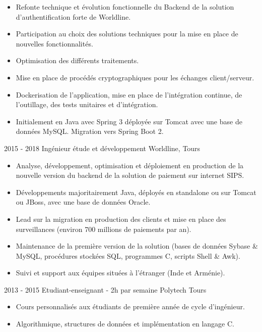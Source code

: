 \documentclass[]{friggeri-cv}
\begin{document}
\begin{entrylist}
{	\begin{itemize}[leftmargin=*]
		\item Refonte technique et évolution fonctionnelle du Backend de la solution d'authentification forte de Worldline.
		\item Participation au choix des solutions techniques pour la mise en place de nouvelles fonctionnalités.
		\item Optimisation des différents traitements.
		\item Mise en place de procédés cryptographiques pour les échanges client/serveur.
		\item Dockerisation de l'application, mise en place de l'intégration continue, de l'outillage, des tests unitaires et d'intégration.
		\item Initialement en Java avec Spring 3 déployée sur Tomcat avec une base de données MySQL. Migration vers Spring Boot 2.
	\end{itemize}
	}
      \entry
    {2015 - 2018}
    {Ingénieur étude et développement}
    {Worldline, Tours}
    {
    \vspace{-0.8\baselineskip}
    \begin{itemize}[leftmargin=*]
		\item Analyse, développement, optimisation et déploiement en production de la nouvelle version du backend de la solution de paiement sur internet SIPS.
		\item Développements majoritairement Java, déployés en standalone ou sur Tomcat ou JBoss,  avec une base de données Oracle.
		\item Lead sur la migration en production des clients et mise en place des surveillances (environ 700 millions de paiements par an).
		\item Maintenance de la première version de la solution (bases de données Sybase \& MySQL, procédures stockées SQL, programmes C, scripts Shell \& Awk).
		\item Suivi et support aux équipes situées à l'étranger (Inde et Arménie).
	\end{itemize}
}
    \entry
    {2013 - 2015}
    {Etudiant-enseignant - 2h par semaine}
    {Polytech Tours}
    {
    \vspace{-0.8\baselineskip}
	\begin{itemize}[leftmargin=*]
		\item Cours personnalisés aux étudiants de première année de cycle d'ingénieur. 
		\item Algorithmique, structures de données et implémentation en langage C.
	\end{itemize}
    }
\end{entrylist}
\end{document}
